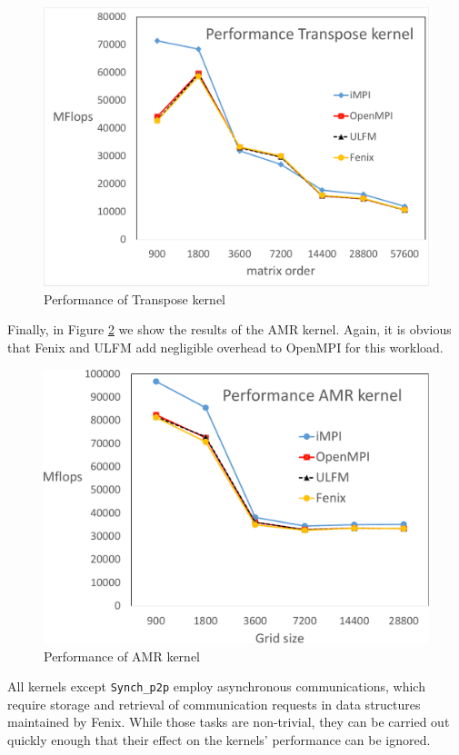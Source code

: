 \begin{figure}
  \centering
  \includegraphics[width=\columnwidth]{transpose_overheads-crop.pdf}
  \caption{Performance of Transpose kernel}
  \label{fig:transpose}
\end{figure}

Finally, in Figure \ref{fig:AMR} we show the results of the AMR kernel.
Again, it is obvious that Fenix and ULFM add negligible overhead to
OpenMPI for this workload.
\begin{figure}
  \centering
  \includegraphics[width=\columnwidth]{AMR_overheads-crop.pdf}
  \caption{Performance of AMR kernel}
  \label{fig:AMR}
\end{figure}

All kernels except \texttt{Synch\_p2p} employ asynchronous communications,
which require storage and retrieval of communication requests in
data structures maintained by Fenix.
While those tasks are non-trivial, they can be carried out quickly enough that
their effect on the kernels' performance can be ignored.

